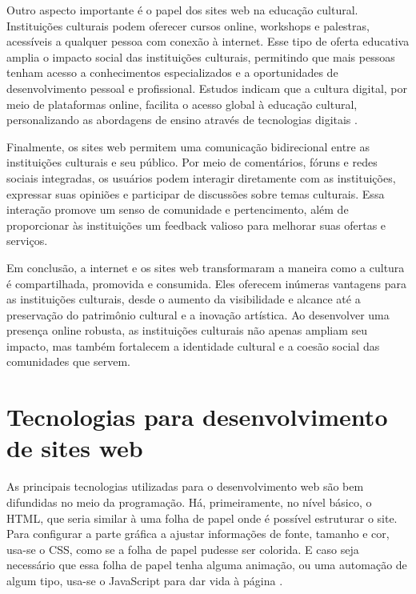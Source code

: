 Outro aspecto importante é o papel dos sites web na educação cultural. Instituições culturais podem oferecer cursos online, workshops e palestras, acessíveis a qualquer pessoa com conexão à internet. Esse tipo de oferta educativa amplia o impacto social das instituições culturais, permitindo que mais pessoas tenham acesso a conhecimentos especializados e a oportunidades de desenvolvimento pessoal e profissional. Estudos indicam que a cultura digital, por meio de plataformas online, facilita o acesso global à educação cultural, personalizando as abordagens de ensino através de tecnologias digitais \cite{xiong2019}.

Finalmente, os sites web permitem uma comunicação bidirecional entre as instituições culturais e seu público. Por meio de comentários, fóruns e redes sociais integradas, os usuários podem interagir diretamente com as instituições, expressar suas opiniões e participar de discussões sobre temas culturais. Essa interação promove um senso de comunidade e pertencimento, além de proporcionar às instituições um feedback valioso para melhorar suas ofertas e serviços.

Em conclusão, a internet e os sites web transformaram a maneira como a cultura é compartilhada, promovida e consumida. Eles oferecem inúmeras vantagens para as instituições culturais, desde o aumento da visibilidade e alcance até a preservação do patrimônio cultural e a inovação artística. Ao desenvolver uma presença online robusta, as instituições culturais não apenas ampliam seu impacto, mas também fortalecem a identidade cultural e a coesão social das comunidades que servem.

\section{Tecnologias para desenvolvimento de sites web}

As principais tecnologias utilizadas para o desenvolvimento web são bem difundidas no meio da programação. Há, primeiramente, no nível básico, o \ac{HTML}, que seria similar à uma folha de papel onde é possível estruturar o site. Para configurar a parte gráfica a ajustar informações de fonte, tamanho e cor, usa-se o \ac{CSS}, como se a folha de papel pudesse ser colorida. E caso seja necessário que essa folha de papel tenha alguma animação, ou uma automação de algum tipo, usa-se o JavaScript para dar vida à página \cite{W3C}.

